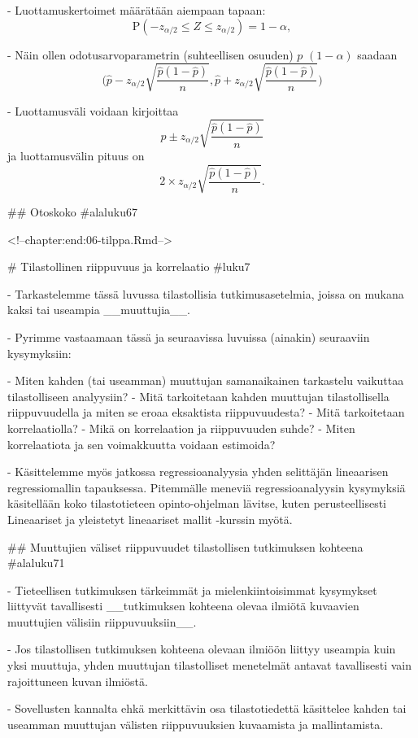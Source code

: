 \documentclass[
]{book}
\begin{document}
\begin{itemize}
- Luottamuskertoimet määrätään aiempaan tapaan:
$$
\text{P}(-z_{\alpha/2} \le Z \le z_{\alpha/2}) = 1-\alpha,
$$


- Näin ollen odotusarvoparametrin (suhteellisen osuuden) $p$ $(1-\alpha)$%
saadaan
$$
\Big(
\widehat{p} - z_{\alpha/2} \sqrt{\frac{\widehat{p}(1-\widehat{p})}{n}},
\widehat{p} + z_{\alpha/2} \sqrt{\frac{\widehat{p}(1-\widehat{p})}{n}} 
\Big)
$$

- Luottamusväli voidaan kirjoittaa
$$
\widehat{p} \pm z_{\alpha/2} \sqrt{\frac{\widehat{p}(1-\widehat{p})}{n}}
$$
ja luottamusvälin pituus on 
$$
2 \times z_{\alpha/2} \sqrt{\frac{\widehat{p}(1-\widehat{p})}{n}}.
$$

## Otoskoko {#alaluku67}


<!--chapter:end:06-tilppa.Rmd-->

# Tilastollinen riippuvuus ja korrelaatio {#luku7}

- Tarkastelemme tässä luvussa tilastollisia tutkimusasetelmia, joissa on mukana kaksi tai useampia __muuttujia__. 

- Pyrimme vastaamaan tässä ja seuraavissa luvuissa (ainakin) seuraaviin kysymyksiin:

  - Miten kahden (tai useamman) muuttujan samanaikainen tarkastelu vaikuttaa tilastolliseen analyysiin?
  - Mitä tarkoitetaan kahden muuttujan tilastollisella riippuvuudella ja miten se eroaa eksaktista riippuvuudesta?
  - Mitä tarkoitetaan korrelaatiolla?
  - Mikä on korrelaation ja riippuvuuden suhde?
  - Miten korrelaatiota ja sen voimakkuutta voidaan estimoida?

- Käsittelemme myös jatkossa regressioanalyysia yhden selittäjän lineaarisen regressiomallin tapauksessa. Pitemmälle meneviä regressioanalyysin kysymyksiä käsitellään koko tilastotieteen opinto-ohjelman lävitse, kuten perusteellisesti Lineaariset ja yleistetyt lineaariset mallit -kurssin myötä.

## Muuttujien väliset riippuvuudet tilastollisen tutkimuksen kohteena {#alaluku71}

- Tieteellisen tutkimuksen tärkeimmät ja mielenkiintoisimmat kysymykset liittyvät tavallisesti __tutkimuksen kohteena olevaa ilmiötä kuvaavien muuttujien välisiin riippuvuuksiin__.

- Jos tilastollisen tutkimuksen kohteena olevaan ilmiöön liittyy useampia kuin yksi muuttuja, yhden muuttujan tilastolliset menetelmät antavat tavallisesti vain rajoittuneen kuvan ilmiöstä.

- Sovellusten kannalta ehkä merkittävin osa tilastotiedettä käsittelee kahden tai useamman muuttujan välisten riippuvuuksien kuvaamista ja mallintamista.


\end{itemize}
\end{document}
